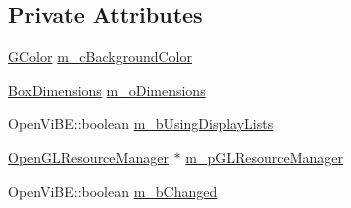 \subsection*{Private Attributes}
\begin{DoxyCompactItemize}
\item 
\hyperlink{structOpenViBEApplications_1_1GColor}{GColor} \hyperlink{classOpenViBEApplications_1_1GObject_af3047a4440cedc2435e2aba09147f604}{m\_\-cBackgroundColor}
\item 
\hyperlink{structOpenViBEApplications_1_1__BoxDimensions}{BoxDimensions} \hyperlink{classOpenViBEApplications_1_1GObject_a7ee79036a5ad68e821c6562545e24c39}{m\_\-oDimensions}
\item 
OpenViBE::boolean \hyperlink{classOpenViBEApplications_1_1GObject_aec2fbd9d9253296f7229133687ef0cc6}{m\_\-bUsingDisplayLists}
\item 
\hyperlink{classOpenViBEApplications_1_1OpenGLResourceManager}{OpenGLResourceManager} $\ast$ \hyperlink{classOpenViBEApplications_1_1GObject_adc285991bd494bd315215a8bdb15f0b9}{m\_\-pGLResourceManager}
\item 
OpenViBE::boolean \hyperlink{classOpenViBEApplications_1_1GObject_a49d4baadc9eed7153bd6ddf9cdca246c}{m\_\-bChanged}
\end{DoxyCompactItemize}


